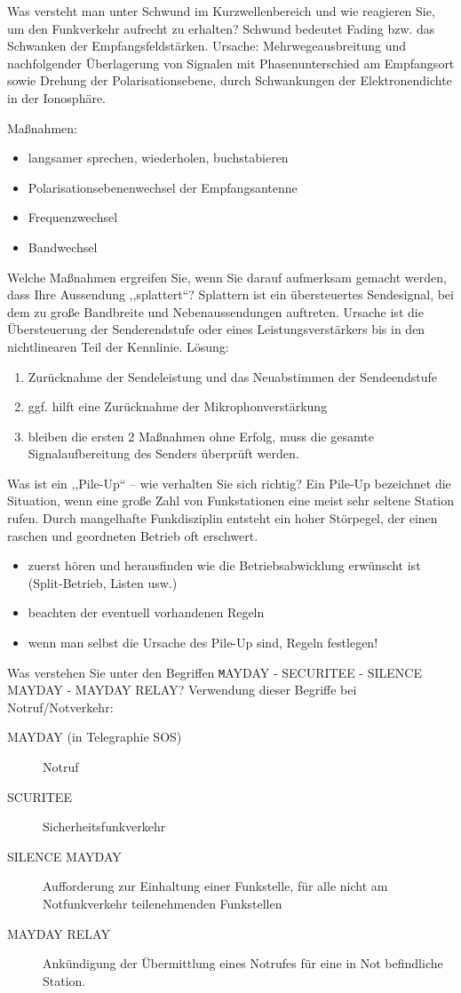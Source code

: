 \documentclass[avery5371,grid,frame,a4paper]{flashcards}
\newcommand{\card}[3]{
  \begin{flashcard}[{\chap} -- #1]{#2}#3\end{flashcard}
}
\begin{document}
\card{44}{Was versteht man unter Schwund im Kurzwellenbereich und wie reagieren Sie, um den Funkverkehr aufrecht zu erhalten?}{
  \small
  Schwund bedeutet Fading bzw. das Schwanken der Empfangsfeldstärken. Ursache: Mehrwegeausbreitung und nachfolgender Überlagerung von Signalen mit Phasenunterschied am Empfangsort sowie Drehung der Polarisationsebene, durch Schwankungen der Elektronendichte in der Ionosphäre.

  Maßnahmen:
  \begin{itemize}\itemsep0pt
    \item langsamer sprechen, wiederholen, buchstabieren
    \item Polarisationsebenenwechsel der Empfangsantenne
    \item Frequenzwechsel
    \item Bandwechsel
  \end{itemize}
}
\card{45}{Welche Maßnahmen ergreifen Sie, wenn Sie darauf aufmerksam gemacht werden, dass Ihre Aussendung ,,splattert``?}{
  \footnotesize
  Splattern ist ein übersteuertes Sendesignal, bei dem zu große Bandbreite und Nebenaussendungen auftreten. Ursache ist die Übersteuerung der Senderendstufe oder eines Leistungsverstärkers bis in den  nichtlinearen Teil der Kennlinie. Lösung:
  \begin{enumerate}
    \item Zurücknahme der Sendeleistung und das Neuabstimmen der Sendeendstufe
    \item ggf. hilft eine Zurücknahme der Mikrophonverstärkung
    \item bleiben die ersten 2 Maßnahmen ohne Erfolg, muss die gesamte Signalaufbereitung des Senders überprüft werden.
  \end{enumerate}
}
\card{46}{Was ist ein ,,Pile-Up`` -- wie verhalten Sie sich richtig?}{
  \small
  Ein Pile-Up bezeichnet die Situation, wenn eine große Zahl von Funkstationen eine meist sehr seltene Station rufen. Durch mangelhafte Funkdisziplin entsteht ein hoher Störpegel, der einen raschen und geordneten Betrieb oft erschwert.
  \begin{itemize}
    \item zuerst hören und herausfinden wie die Betriebsabwicklung erwünscht ist (Split-Betrieb, Listen usw.)
    \item beachten der eventuell vorhandenen Regeln
    \item wenn man selbst die Ursache des Pile-Up  sind, Regeln festlegen!
  \end{itemize}
}
\card{47}{Was verstehen Sie unter den Begriffen {\footnotesize\texttt MAYDAY - SECURITEE - SILENCE MAYDAY - MAYDAY RELAY?}}{
  \small
  Verwendung dieser Begriffe bei Notruf/Notverkehr:
  \begin{description}
    \item[MAYDAY (in Telegraphie SOS)] Notruf
    \item[SCURITEE] Sicherheitsfunkverkehr
    \item[SILENCE MAYDAY] Aufforderung zur Einhaltung einer Funkstelle, für alle nicht am Notfunkverkehr teilenehmenden Funkstellen
    \item[MAYDAY RELAY] Ankündigung der Übermittlung eines Notrufes für eine in Not befindliche Station.
  \end{description}
}
\end{document}
